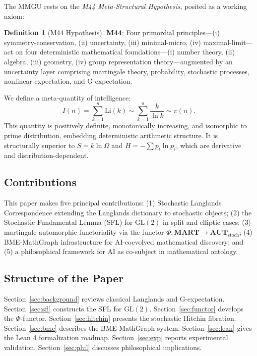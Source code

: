\documentclass[11pt,a4paper]{article}
\theoremstyle{definition}
\newtheorem{definition}[theorem]{Definition}
\newcommand{\GL}{\mathrm{GL}}
\newcommand{\Li}{\mathrm{Li}}
\newcommand{\MART}{\mathbf{MART}}
\newcommand{\AUT}{\mathbf{AUT}_{\mathrm{stoch}}}
\begin{document}
The MMGU rests on the \emph{M44 Meta-Structural Hypothesis}, posited as a working axiom:

\begin{definition}[M44 Hypothesis]\label{def:m44}
\textbf{M44}: Four primordial principles---(i) symmetry-conservation, (ii) uncertainty, (iii) minimal-micro, (iv) maximal-limit---act on four deterministic mathematical foundations---(i) number theory, (ii) algebra, (iii) geometry, (iv) group representation theory---augmented by an uncertainty layer comprising martingale theory, probability, stochastic processes, nonlinear expectation, and G-expectation.
\end{definition}

We define a meta-quantity of intelligence:
\[
I(n) = \sum_{k=1}^{n} \Li(k) \sim \sum_{k=1}^{n} \frac{k}{\ln k} \sim \pi(n).
\]
This quantity is positively definite, monotonically increasing, and isomorphic to prime distribution, embedding deterministic arithmetic structure. It is structurally superior to $S = k\ln\Omega$ and $H = -\sum p_i\ln p_i$, which are derivative and distribution-dependent.

\subsection{Contributions}

This paper makes five principal contributions: (1) Stochastic Langlands Correspondence extending the Langlands dictionary to stochastic objects; (2) the Stochastic Fundamental Lemma (SFL) for $\GL(2)$ in split and elliptic cases; (3) martingale-automorphic functoriality via the functor $\Phi: \MART \to \AUT$; (4) BME-MathGraph infrastructure for AI-coevolved mathematical discovery; and (5) a philosophical framework for AI as co-subject in mathematical ontology.

\subsection{Structure of the Paper}

Section~\ref{sec:background} reviews classical Langlands and G-expectation. Section~\ref{sec:sfl} constructs the SFL for $\GL(2)$. Section~\ref{sec:functor} develops the $\Phi$-functor. Section~\ref{sec:hitchin} presents the stochastic Hitchin fibration. Section~\ref{sec:bme} describes the BME-MathGraph system. Section~\ref{sec:lean} gives the Lean 4 formalization roadmap. Section~\ref{sec:exp} reports experimental validation. Section~\ref{sec:phil} discusses philosophical implications.
\end{document}
